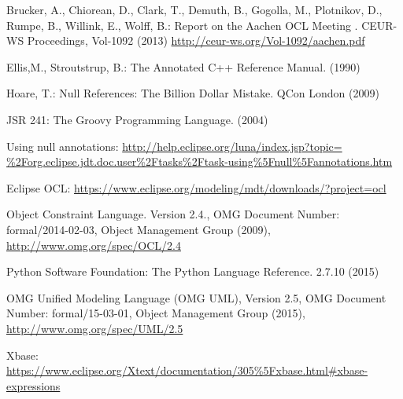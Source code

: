 \documentclass{llncs}
\begin{document}
%
%
\begin{thebibliography}{}
%
Brucker, A., Chiorean, D., Clark, T., Demuth, B., Gogolla, M., Plotnikov, D., Rumpe, B., Willink, E., Wolff, B.:
Report on the Aachen OCL Meeting .
CEUR-WS Proceedings, Vol-1092 (2013)
\url{http://ceur-ws.org/Vol-1092/aachen.pdf}

Ellis,M., Stroutstrup, B.:
The Annotated C++ Reference Manual.
(1990)

Hoare, T.:
Null References: The Billion Dollar Mistake.
QCon London (2009)

JSR 241:
The Groovy Programming Language.
(2004)

Using null annotations:
\url{http://help.eclipse.org/luna/index.jsp?topic=
\%2Forg.eclipse.jdt.doc.user\%2Ftasks\%2Ftask-using\%5Fnull\%5Fannotations.htm}

Eclipse OCL:
\url{https://www.eclipse.org/modeling/mdt/downloads/?project=ocl}

 Object Constraint Language. Version 2.4., OMG Document Number: formal/2014-02-03, Object Management Group (2009),  \url{http://www.omg.org/spec/OCL/2.4}

Python Software Foundation:
The Python Language Reference.
2.7.10 (2015)

 OMG Unified Modeling Language (OMG UML), Version 2.5, {OMG Document Number}: formal/15-03-01, Object Management Group (2015), \url{http://www.omg.org/spec/UML/2.5}

Xbase:
\url{https://www.eclipse.org/Xtext/documentation/305\%5Fxbase.html\#xbase-expressions}

\end{thebibliography}
\end{document}
